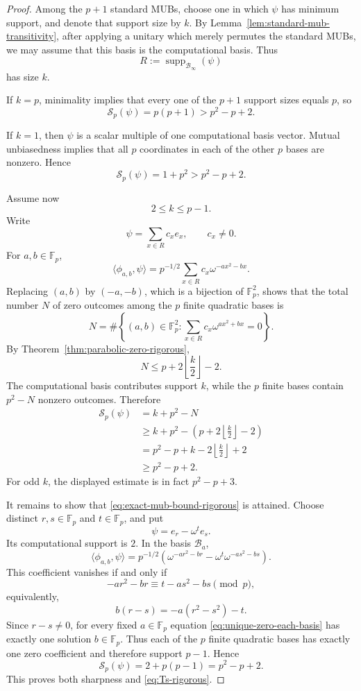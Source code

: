 \documentclass[11pt]{article}
\newcommand{\F}{\mathbb F}
\newcommand{\supp}{\operatorname{supp}}
\begin{document}
\begin{proof}
Among the \(p+1\) standard MUBs, choose one in which \(\psi\) has
minimum support, and denote that support size by \(k\).
By Lemma~\ref{lem:standard-mub-transitivity}, after applying a unitary
which merely permutes the standard MUBs, we may assume that this basis is
the computational basis.  Thus
\[
 R:=\supp_{\mathcal B_\infty}(\psi)
\]
has size \(k\).

If \(k=p\), minimality implies that every one of the \(p+1\) support
sizes equals \(p\), so
\[
 \mathcal S_p(\psi)=p(p+1)>p^2-p+2.
\]

If \(k=1\), then \(\psi\) is a scalar multiple of one computational
basis vector.  Mutual unbiasedness implies that all \(p\) coordinates
in each of the other \(p\) bases are nonzero.  Hence
\[
 \mathcal S_p(\psi)=1+p^2>p^2-p+2.
\]

Assume now
\[
 2\le k\le p-1.
\]
Write
\[
 \psi=\sum_{x\in R}c_x e_x,
 \qquad c_x\ne0.
\]
For \(a,b\in\F_p\),
\[
 \langle\phi_{a,b},\psi\rangle
 =
 p^{-1/2}
 \sum_{x\in R}
 c_x\omega^{-a x^2-b x}.
\]
Replacing \((a,b)\) by \((-a,-b)\), which is a bijection of
\(\F_p^2\), shows that the total number \(N\) of zero outcomes among the
\(p\) finite quadratic bases is
\[
 N
 =
 \#\left\{
 (a,b)\in\F_p^2:
 \sum_{x\in R}c_x\omega^{a x^2+b x}=0
 \right\}.
\]
By Theorem~\ref{thm:parabolic-zero-rigorous},
\[
 N
 \le
 p+2\left\lfloor\frac{k}{2}\right\rfloor-2.
\]
The computational basis contributes support \(k\), while the \(p\)
finite bases contain \(p^2-N\) nonzero outcomes.  Therefore
\[
 \begin{aligned}
 \mathcal S_p(\psi)
 &=k+p^2-N\\
 &\ge
 k+p^2-
 \left(
 p+2\left\lfloor\frac{k}{2}\right\rfloor-2
 \right)\\
 &=
 p^2-p+
 k-2\left\lfloor\frac{k}{2}\right\rfloor+2\\
 &\ge p^2-p+2.
 \end{aligned}
\]
For odd \(k\), the displayed estimate is in fact
\(p^2-p+3\).

It remains to show that \eqref{eq:exact-mub-bound-rigorous} is attained.
Choose distinct \(r,s\in\F_p\) and \(t\in\F_p\), and put
\[
 \psi=e_r-\omega^t e_s.
\]
Its computational support is \(2\).  In the basis \(\mathcal B_a\),
\[
 \langle\phi_{a,b},\psi\rangle
 =
 p^{-1/2}
 \left(
 \omega^{-ar^2-br}
 -
 \omega^t\omega^{-as^2-bs}
 \right).
\]
This coefficient vanishes if and only if
\[
 -ar^2-br
 \equiv
 t-as^2-bs
 \pmod p,
\]
equivalently,
\begin{equation}
 b(r-s)
 =
 -a(r^2-s^2)-t.
 \label{eq:unique-zero-each-basis}
\end{equation}
Since \(r-s\ne0\), for every fixed \(a\in\F_p\) equation
\eqref{eq:unique-zero-each-basis} has exactly one solution
\(b\in\F_p\).  Thus each of the \(p\) finite quadratic bases has exactly
one zero coefficient and therefore support \(p-1\).  Hence
\[
 \mathcal S_p(\psi)
 =
 2+p(p-1)
 =
 p^2-p+2.
\]
This proves both sharpness and \eqref{eq:Ts-rigorous}.
\end{proof}
\end{document}
